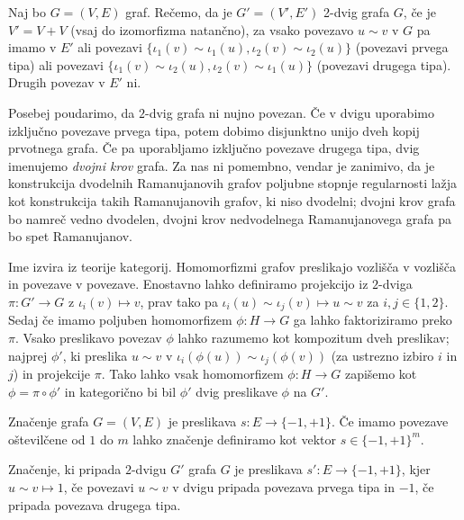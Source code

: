 \begin{definicija}
    Naj bo \(G = (V, E)\) graf. Rečemo, da je \(G'= (V', E')\) 2-dvig grafa \(G\), če je \(V' = V + V\) (vsaj do izomorfizma natančno), za vsako povezavo \(u\sim v\) v \(G\) pa imamo v \(E'\) ali povezavi \(\{\iota_1(v)\sim \iota_1(u), \iota_2(v)\sim \iota_2(u)\}\) (povezavi prvega tipa) ali povezavi \(\{\iota_1(v)\sim \iota_2(u), \iota_2(v)\sim \iota_1(u)\}\) (povezavi drugega tipa). Drugih povezav v \(E'\) ni.
\end{definicija}

Posebej poudarimo, da \(2\)-dvig grafa ni nujno povezan. Če v dvigu uporabimo izključno povezave prvega tipa, potem dobimo disjunktno unijo dveh kopij prvotnega grafa. Če pa uporabljamo izključno povezave drugega tipa, dvig imenujemo \emph{dvojni krov} grafa. Za nas ni pomembno, vendar je zanimivo, da je konstrukcija dvodelnih Ramanujanovih grafov poljubne stopnje regularnosti lažja kot konstrukcija takih Ramanujanovih grafov, ki niso dvodelni; dvojni krov grafa bo namreč vedno dvodelen, dvojni krov nedvodelnega Ramanujanovega grafa pa bo spet Ramanujanov.

Ime izvira iz teorije kategorij. Homomorfizmi grafov preslikajo vozlišča v vozlišča in povezave v povezave. Enostavno lahko definiramo projekcijo iz \(2\)-dviga \(\pi: G'\to G\) z \(\iota_i(v)\mapsto v\), prav tako pa \(\iota_i(u)\sim\iota_j(v)\mapsto u\sim v\) za \(i, j\in \{1,2\}\). Sedaj če imamo poljuben homomorfizem \(\phi: H\to G\) ga lahko faktoriziramo preko \(\pi\). Vsako preslikavo povezav \(\phi\) lahko razumemo kot kompozitum dveh preslikav; najprej \(\phi'\), ki preslika \(u\sim v\) v \(\iota_i(\phi(u)) \sim \iota_j(\phi(v))\) (za ustrezno izbiro \(i\) in \(j\)) in projekcije \(\pi\). Tako lahko vsak homomorfizem \(\phi: H\to G\) zapišemo kot \(\phi = \pi\circ \phi'\) in kategorično bi bil \(\phi'\) dvig preslikave \(\phi\) na \(G'\).

\begin{definicija}
    Značenje grafa \(G = (V, E)\) je preslikava \(s: E\to \{-1, +1\}\). Če imamo povezave oštevilčene od \(1\) do \(m\) lahko značenje definiramo kot vektor \(s\in \{-1, +1\}^m\).

    Značenje, ki pripada \(2\)-dvigu \(G'\) grafa \(G\) je preslikava \(s': E \to \{-1, +1\}\), kjer \(u\sim v \mapsto 1\), če povezavi \(u\sim v\) v dvigu pripada povezava prvega tipa in \(-1\), če pripada povezava drugega tipa.
\end{definicija}

